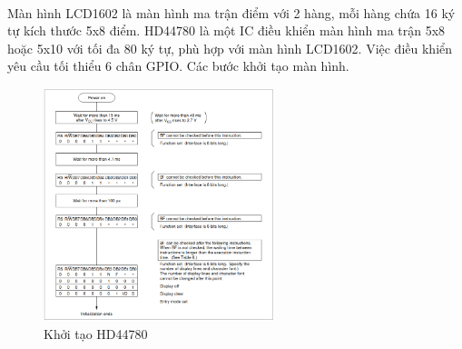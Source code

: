 \paragraph{}
Màn hình LCD1602 là màn hình ma trận điểm với 2 hàng, mỗi hàng chứa 16 ký tự kích thước 5x8 điểm. HD44780 là một IC điều khiển màn hình ma trận 5x8 hoặc 5x10 với tối đa 80 ký tự, phù hợp với màn hình LCD1602. Việc điều khiển yêu cầu tối thiểu 6 chân GPIO. Các bước khởi tạo màn hình.


\begin{figure}[H]
	\centering
	\includegraphics[width=0.6\textwidth]{../images/hd44780_init.png}
	\caption{Khởi tạo HD44780}
\end{figure}